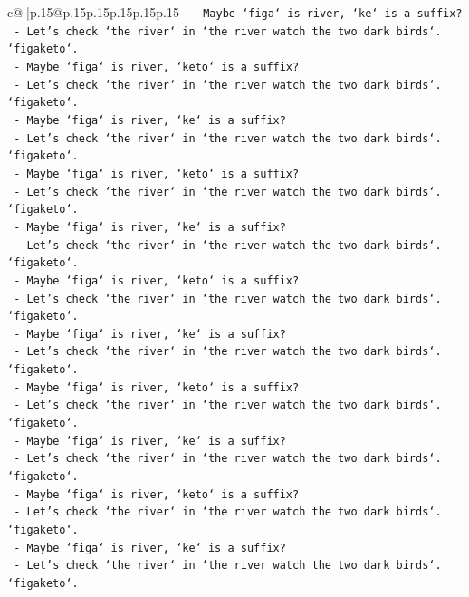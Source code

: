 \documentclass{article}
\begin{document}
{\begin{supertabular}{c@{$\;$}|p{.15\linewidth}@{}p{.15\linewidth}p{.15\linewidth}p{.15\linewidth}p{.15\linewidth}p{.15\linewidth}}
{{{\texttt{     {-} Maybe `figa` is river, `ke` is a suffix?} \\
\texttt{     {-} Let's check `the river` in `the river watch the two dark birds`. `figaketo`.} \\
\texttt{     {-} Maybe `figa` is river, `keto` is a suffix?} \\
\texttt{     {-} Let's check `the river` in `the river watch the two dark birds`. `figaketo`.} \\
\texttt{     {-} Maybe `figa` is river, `ke` is a suffix?} \\
\texttt{     {-} Let's check `the river` in `the river watch the two dark birds`. `figaketo`.} \\
\texttt{     {-} Maybe `figa` is river, `keto` is a suffix?} \\
\texttt{     {-} Let's check `the river` in `the river watch the two dark birds`. `figaketo`.} \\
\texttt{     {-} Maybe `figa` is river, `ke` is a suffix?} \\
\texttt{     {-} Let's check `the river` in `the river watch the two dark birds`. `figaketo`.} \\
\texttt{     {-} Maybe `figa` is river, `keto` is a suffix?} \\
\texttt{     {-} Let's check `the river` in `the river watch the two dark birds`. `figaketo`.} \\
\texttt{     {-} Maybe `figa` is river, `ke` is a suffix?} \\
\texttt{     {-} Let's check `the river` in `the river watch the two dark birds`. `figaketo`.} \\
\texttt{     {-} Maybe `figa` is river, `keto` is a suffix?} \\
\texttt{     {-} Let's check `the river` in `the river watch the two dark birds`. `figaketo`.} \\
\texttt{     {-} Maybe `figa` is river, `ke` is a suffix?} \\
\texttt{     {-} Let's check `the river` in `the river watch the two dark birds`. `figaketo`.} \\
\texttt{     {-} Maybe `figa` is river, `keto` is a suffix?} \\
\texttt{     {-} Let's check `the river` in `the river watch the two dark birds`. `figaketo`.} \\
\texttt{     {-} Maybe `figa` is river, `ke` is a suffix?} \\
\texttt{     {-} Let's check `the river` in `the river watch the two dark birds`. `figaketo`.} \\
}}}
\end{supertabular}}
\end{document}
